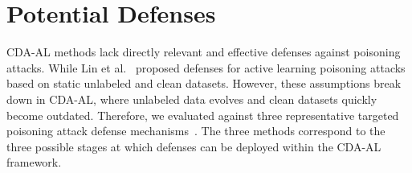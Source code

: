 \section{Potential Defenses}
\label{Sec: Potential Defenses}
CDA-AL methods lack directly relevant and effective defenses against poisoning attacks.
While Lin et al.~\cite{2021-GLOBALCOM-acctive-learning-under-malicious-mislabeling-poisoning-attacks} proposed defenses for active learning poisoning attacks based on static unlabeled and clean datasets. 
However, these assumptions break down in CDA-AL, where unlabeled data evolves and clean datasets quickly become outdated.
Therefore, we evaluated \pandora against three representative targeted poisoning attack defense mechanisms~\cite{chen2018detecting,DFP,2023-ICCV-Trigger-Detect}.
The three methods correspond to the three possible stages at which defenses can be deployed within the CDA-AL framework. 

